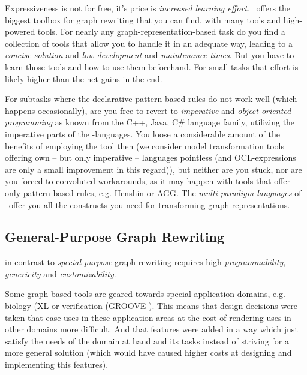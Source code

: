 Expressiveness is not for free, it's price is \emph{increased learning effort}.
\GrG\ offers the biggest toolbox for graph rewriting that you can find, with many tools and high-powered tools.
For nearly any graph-representation-based task do you find a collection of tools that allow you to handle it in an adequate way, leading to a \emph{concise solution} and \emph{low development} and \emph{maintenance times}.
But you have to learn those tools and how to use them beforehand.
For small tasks that effort is likely higher than the net gains in the end.

For subtasks where the declarative pattern-based rules do not work well (which happens occasionally), are you free to revert to \emph{imperative} and \emph{object-oriented programming} as known from the C++, Java, C\# language family, utilizing the imperative parts of the \GrG-languages.
You loose a considerable amount of the benefits of employing the tool then (we consider model transformation tools offering own -- but only imperative -- languages pointless (and OCL-expressions are only a small improvement in this regard)), but neither are you stuck, nor are you forced to convoluted workarounds, as it may happen with tools that offer only pattern-based rules, e.g. Henshin\cite{Henshin} or AGG\cite{agg}.
The \emph{multi-paradigm languages} of \GrG\ offer you all the constructs you need for transforming graph-representations.

\subsection*{General-Purpose Graph Rewriting}
in contrast to \emph{special-purpose} graph rewriting requires high \emph{programmability}, \emph{genericity} and \emph{customizability}.

Some graph based tools are geared towards special application domains, e.g. biology (XL \cite{xl} or verification (GROOVE \cite{Groove}).
This means that design decisions were taken that ease uses in these application areas at the cost of rendering uses in other domains more difficult.
And that features were added in a way which just satisfy the needs of the domain at hand and its tasks instead of striving for a more general solution (which would have caused higher costs at designing and implementing this features).

